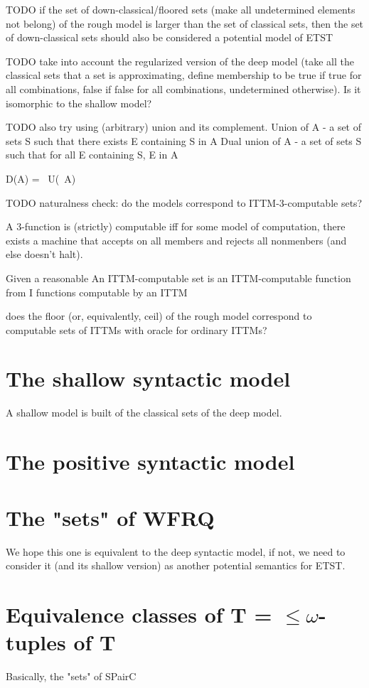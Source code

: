 \documentclass[oneside,12pt]{book}
\theoremstyle{definition}
\theoremstyle{remark}
\begin{document}
TODO if the set of down-classical/floored sets (make all undetermined elements
not belong) of the rough model is larger than the set of classical sets, then
the set of down-classical sets should also be considered a potential model of ETST

TODO take into account the regularized version of the deep model (take all the classical
sets that a set is approximating, define membership to be true if true for all combinations,
false if false for all combinations, undetermined otherwise). Is it isomorphic
to the shallow model?

TODO also try using (arbitrary) union and its complement.
Union of A - a set of sets S such that there exists E containing S in A
Dual union of A - a set of sets S such that for all E containing S, E in A

D(A) = ~U(~A)

TODO naturalness check: do the models correspond to ITTM-3-computable sets?

A 3-function is (strictly) computable iff for some model of computation,
there exists a machine that accepts on all members and rejects all nonmenbers
(and else doesn't halt).

Given a reasonable
An ITTM-computable set is an ITTM-computable function from I
functions
computable by an ITTM

does the floor (or, equivalently, ceil) of the rough model correspond to
computable sets of ITTMs with oracle for ordinary ITTMs?

\section{The shallow syntactic model}
A shallow model is built of the classical sets of the deep model.

\section{The positive syntactic model}

\section{The "sets" of WFRQ}
We hope this one is equivalent to the deep syntactic model, if not, we need to
consider it (and its shallow version) as another potential semantics for ETST.

\section{Equivalence classes of T = $\leq\omega$-tuples of T}
Basically, the "sets" of SPairC
\end{document}
